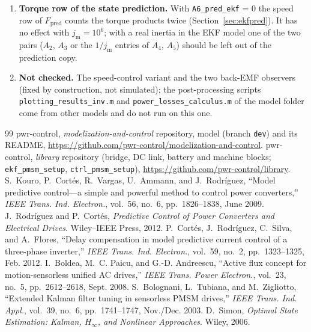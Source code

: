 \documentclass[11pt,a4paper]{scrartcl}
\newcommand{\ped}[1]{_{\mathrm{#1}}}
\newcommand{\code}[1]{\texttt{#1}}
\begin{document}
\begin{onehalfspace}
\begin{enumerate}[nosep]
	\item \label{op:torque} \textbf{Torque row of the state prediction.} With \code{A6\_pred\_ekf} = 0 the speed row of $F\ped{pred}$ counts the torque products twice (Section~\ref{sec:ekfpred}). It has no effect with $j\ped{m} = 10^6$; with a real inertia in the EKF model one of the two pairs ($A_2$, $A_3$ or the $1/j\ped{m}$ entries of $A_4$, $A_5$) should be left out of the prediction copy.
	\item \textbf{Not checked.} The speed-control variant and the two back-EMF observers (fixed by construction, not simulated); the post-processing scripts \code{plotting\_results\_inv.m} and \code{power\_losses\_calculus.m} of the model folder come from other models and do not run on this one.
\end{enumerate}

\begin{thebibliography}{99}
	 pwr-control, \textit{modelization-and-control} repository, model  (branch \code{dev}) and its README, \url{https://github.com/pwr-control/modelization-and-control}.
	 pwr-control, \textit{library} repository (bridge, DC link, battery and machine blocks; \code{ekf\_pmsm\_setup}, \code{ctrl\_pmsm\_setup}), \url{https://github.com/pwr-control/library}.
	 S.~Kouro, P.~Cort\'es, R.~Vargas, U.~Ammann, and J.~Rodr\'iguez, ``Model predictive control---a simple and powerful method to control power converters,'' \emph{IEEE Trans. Ind. Electron.}, vol.~56, no.~6, pp.~1826--1838, June 2009.
	 J.~Rodr\'iguez and P.~Cort\'es, \emph{Predictive Control of Power Converters and Electrical Drives}. Wiley--IEEE Press, 2012.
	 P.~Cort\'es, J.~Rodr\'iguez, C.~Silva, and A.~Flores, ``Delay compensation in model predictive current control of a three-phase inverter,'' \emph{IEEE Trans. Ind. Electron.}, vol.~59, no.~2, pp.~1323--1325, Feb. 2012.
	 I.~Boldea, M.~C. Paicu, and G.-D. Andreescu, ``Active flux concept for motion-sensorless unified AC drives,'' \emph{IEEE Trans. Power Electron.}, vol.~23, no.~5, pp.~2612--2618, Sept. 2008.
	 S.~Bolognani, L.~Tubiana, and M.~Zigliotto, ``Extended Kalman filter tuning in sensorless PMSM drives,'' \emph{IEEE Trans. Ind. Appl.}, vol.~39, no.~6, pp.~1741--1747, Nov./Dec. 2003.
	 D.~Simon, \emph{Optimal State Estimation: Kalman, $H_\infty$, and Nonlinear Approaches}. Wiley, 2006.

\end{thebibliography}
\end{onehalfspace}
\end{document}
